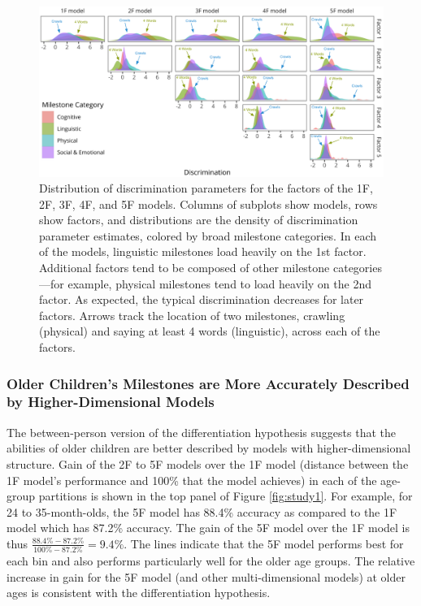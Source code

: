 \documentclass[man, floatsintext]{apa7}
\begin{document}
\begin{figure}
\centering
\includegraphics[width=\columnwidth]{figures/models_new.png}
\caption{Distribution of discrimination parameters for the factors of the 1F, 2F, 3F, 4F, and 5F models. Columns of subplots show models, rows show factors, and distributions are the density of discrimination parameter estimates, colored by broad milestone categories. In each of the models, linguistic milestones load heavily on the 1st factor. Additional factors tend to be composed of other milestone categories—for example, physical milestones tend to load heavily on the 2nd factor. As expected, the typical discrimination decreases for later factors. Arrows track the location of two milestones, crawling (physical) and saying at least 4 words (linguistic), across each of the factors.}
\label{fig:discs}
\end{figure}

\subsubsection{Older Children's Milestones are More Accurately Described
by Higher-Dimensional
Models}

The between-person version of the differentiation
hypothesis suggests that the abilities of older children are better described by models with 
higher-dimensional structure. Gain of the 2F to 5F models over the 1F model (distance between the 1F model's performance and 100\% that the model achieves) in each of the age-group partitions is shown in the top panel of Figure \ref{fig:study1}. For example, for
24 to 35-month-olds, the 5F model has 88.4\% accuracy as compared to the
1F model which has 87.2\% accuracy. The gain of the 5F model over the 1F
model is thus $\frac{88.4\% - 87.2\%}{100\% - 87.2\%} = 9.4\%$. The lines indicate that the 5F model performs best for each bin and also performs particularly well for the older age
groups. The relative increase in gain for the 5F model (and other multi-dimensional models) at older ages is consistent with the differentiation hypothesis.
\end{document}
